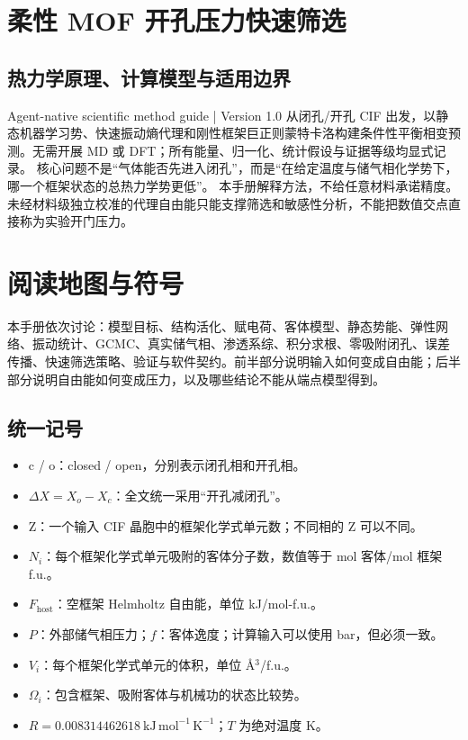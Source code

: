 \documentclass[UTF8,a4paper,11pt]{ctexart}
\begin{document}
\section*{柔性 MOF 开孔压力快速筛选}
\subsection*{热力学原理、计算模型与适用边界}
Agent-native scientific method guide | Version 1.0
从闭孔/开孔 CIF 出发，以静态机器学习势、快速振动熵代理和刚性框架巨正则蒙特卡洛构建条件性平衡相变预测。无需开展 MD 或 DFT；所有能量、归一化、统计假设与证据等级均显式记录。
核心问题不是“气体能否先进入闭孔”，而是“在给定温度与储气相化学势下，哪一个框架状态的总热力学势更低”。
本手册解释方法，不给任意材料承诺精度。未经材料级独立校准的代理自由能只能支撑筛选和敏感性分析，不能把数值交点直接称为实验开门压力。
\clearpage
\section*{阅读地图与符号}
本手册依次讨论：模型目标、结构活化、赋电荷、客体模型、静态势能、弹性网络、振动统计、GCMC、真实储气相、渗透系综、积分求根、零吸附闭孔、误差传播、快速筛选策略、验证与软件契约。前半部分说明输入如何变成自由能；后半部分说明自由能如何变成压力，以及哪些结论不能从端点模型得到。
\subsection*{统一记号}
\begin{itemize}[leftmargin=1.7em,itemsep=0.15em,topsep=0.15em]
\item c / o：closed / open，分别表示闭孔相和开孔相。
\item \(\Delta X = X_o-X_c\)：全文统一采用“开孔减闭孔”。
\item Z：一个输入 CIF 晶胞中的框架化学式单元数；不同相的 Z 可以不同。
\item \(N_i\)：每个框架化学式单元吸附的客体分子数，数值等于 mol 客体/mol 框架 f.u.。
\item \(F_{\mathrm{host}}\)：空框架 Helmholtz 自由能，单位 kJ/mol-f.u.。
\item \(P\)：外部储气相压力；\(f\)：客体逸度；计算输入可以使用 bar，但必须一致。
\item \(V_i\)：每个框架化学式单元的体积，单位 Å\ensuremath{^{3}}/f.u.。
\item \(\Omega_i\)：包含框架、吸附客体与机械功的状态比较势。
\item \(R=0.008314462618\ \mathrm{kJ\,mol^{-1}\,K^{-1}}\)；\(T\) 为绝对温度 K。
\end{itemize}
\end{document}
